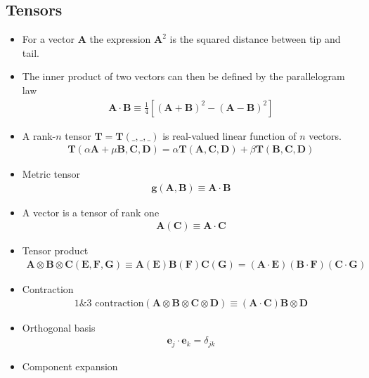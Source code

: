 \documentclass[10pt,a4paper]{article}
\theoremstyle{definition}
\begin{document}
\subsection{Tensors}
\begin{itemize}
\item For a vector $\mathbf{A}$ the expression $\mathbf{A}^2$ is the squared distance between tip and tail.
\item The inner product of two vectors can then be defined by the parallelogram law
\begin{align}
    \mathbf{A}\cdot\mathbf{B}\equiv\frac{1}{4}\left[(\mathbf{A}+\mathbf{B})^2-(\mathbf{A}-\mathbf{B})^2\right]
\end{align}
\item A rank-$n$ tensor $\mathbf{T}=\mathbf{T}(\_,\_,\_)$ is real-valued linear function of $n$ vectors.
\begin{align}
    \mathbf{T}(\alpha\mathbf{A}+\mu\mathbf{B},\mathbf{C},\mathbf{D})=\alpha\mathbf{T}(\mathbf{A},\mathbf{C},\mathbf{D})+\beta\mathbf{T}(\mathbf{B},\mathbf{C},\mathbf{D})
\end{align}
\item Metric tensor
\begin{align}
    \mathbf{g}(\mathbf{A},\mathbf{B})\equiv\mathbf{A}\cdot\mathbf{B}
\end{align}
\item A vector is a tensor of rank one 
\begin{align}
    \mathbf{A}(\mathbf{C})\equiv\mathbf{A}\cdot\mathbf{C}
\end{align}
\item Tensor product 
\begin{align}
    \mathbf{A}\otimes\mathbf{B}\otimes\mathbf{C}(\mathbf{E},\mathbf{F},\mathbf{G})\equiv\mathbf{A}(\mathbf{E})\mathbf{B}(\mathbf{F})\mathbf{C}(\mathbf{G})=(\mathbf{A}\cdot\mathbf{E})(\mathbf{B}\cdot\mathbf{F})(\mathbf{C}\cdot\mathbf{G})
\end{align}
\item Contraction
\begin{align}
    \text{1\&3 contraction}(\mathbf{A}\otimes\mathbf{B}\otimes\mathbf{C}\otimes\mathbf{D})\equiv(\mathbf{A}\cdot\mathbf{C})\mathbf{B}\otimes\mathbf{D}
\end{align}
\item Orthogonal basis
\begin{align}
    \mathbf{e}_j\cdot\mathbf{e}_k=\delta_{jk}
\end{align}
\item Component expansion

\end{itemize}
\end{document}
